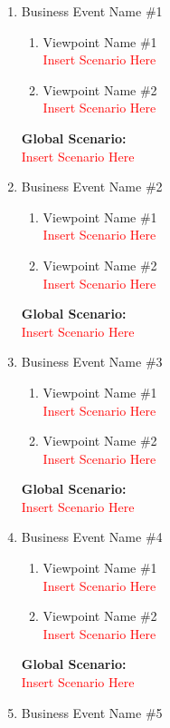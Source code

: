 \documentclass[]{article}
\begin{document}
\begin{enumerate}[label={\bf BE\arabic*.}]
	\item Business Event Name \#1
		\begin{enumerate}[label=\textbf{VP\arabic*.}]
			\item Viewpoint Name \#1 \\
				\textcolor{red}{Insert Scenario Here}
			\item Viewpoint Name \#2 \\
				\textcolor{red}{Insert Scenario Here}
		\end{enumerate}
		{\bf Global Scenario:}\\
		\textcolor{red}{Insert Scenario Here}
	\item Business Event Name \#2
	\begin{enumerate}[label={\bf VP\arabic*.}]
		\item Viewpoint Name \#1 \\
		\textcolor{red}{Insert Scenario Here}
		\item Viewpoint Name \#2 \\
		\textcolor{red}{Insert Scenario Here}
	\end{enumerate}
	{\bf Global Scenario:}\\
	\textcolor{red}{Insert Scenario Here}
	\item Business Event Name \#3
		\begin{enumerate}[label=\textbf{VP\arabic*.}]
			\item Viewpoint Name \#1 \\
				\textcolor{red}{Insert Scenario Here}
			\item Viewpoint Name \#2 \\
				\textcolor{red}{Insert Scenario Here}
		\end{enumerate}
		{\bf Global Scenario:}\\
		\textcolor{red}{Insert Scenario Here}
	\item Business Event Name \#4
	\begin{enumerate}[label={\bf VP\arabic*.}]
		\item Viewpoint Name \#1 \\
		\textcolor{red}{Insert Scenario Here}
		\item Viewpoint Name \#2 \\
		\textcolor{red}{Insert Scenario Here}
	\end{enumerate}
	{\bf Global Scenario:}\\
	\textcolor{red}{Insert Scenario Here}
	\item Business Event Name \#5

\end{enumerate}
\end{document}
